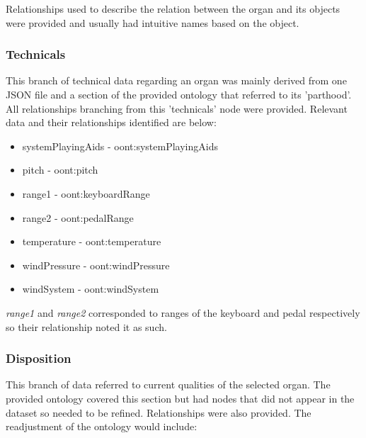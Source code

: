 Relationships used to describe the relation between the organ and its objects were provided and usually had intuitive names based on the object. 

\subsubsection{Technicals}
\hspace*{0.5cm} This branch of technical data regarding an organ was mainly derived from one JSON file and a section of the provided ontology that referred to its 'parthood'. All relationships branching from this 'technicals' node were provided. Relevant data and their relationships identified are below:

\vspace{-0.1cm}
\begin{itemize}
    \itemsep0em 
    \item systemPlayingAids - oont:systemPlayingAids
    \vspace{-0.05cm}
    \item pitch - oont:pitch
    \vspace{-0.05cm}
    \item range1 -  oont:keyboardRange
    \vspace{-0.05cm}
    \item range2 - oont:pedalRange
    \vspace{-0.05cm}
    \item temperature - oont:temperature
    \vspace{-0.05cm}
    \item windPressure - oont:windPressure
    \vspace{-0.05cm}
    \item windSystem - oont:windSystem
\end{itemize}

\textit{range1} and \textit{range2} corresponded to ranges of the keyboard and pedal respectively so their relationship noted it as such. 

\subsubsection{Disposition}
\hspace*{0.5cm} This branch of data referred to current qualities of the selected organ. The provided ontology covered this section but had nodes that did not appear in the dataset so needed to be refined. Relationships were also provided. The readjustment of the ontology would include:

